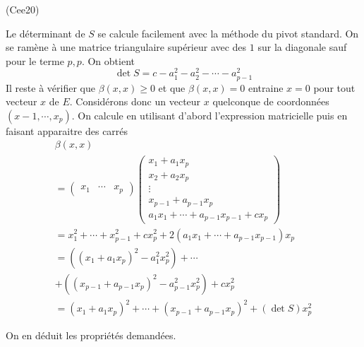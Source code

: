 \begin{tiny}(Cee20)\end{tiny} Le déterminant de $S$ se calcule facilement avec la méthode du pivot standard. On se ramène à une matrice triangulaire supérieur avec des $1$ sur la diagonale sauf pour le terme $p,p$. On obtient
\begin{displaymath}
 \det S = c -a_1^2 - a_2^2 - \cdots - a_{p-1}^2
\end{displaymath}
Il reste à vérifier que $\beta(x,x)\geq 0$ et que $\beta(x,x)=0$ entraine $x=0$ pour tout vecteur $x$ de $E$.\newline
Considérons donc un vecteur $x$ quelconque de coordonnées $(x-1,\cdots,x_p)$. On calcule en utilisant d'abord l'expression matricielle puis en faisant apparaitre des carrés
\begin{multline*}
 \beta(x,x)\\
=
\begin{pmatrix}
 x_1 & \cdots & x_p
\end{pmatrix}
\begin{pmatrix}
 x_1+a_1 x_p \\ x_2+a_2 x_p \\ \vdots \\ x_{p-1}+a_{p-1} x_p \\
a_1x_1+\cdots+a_{p-1}x_{p-1} +cx_p  
\end{pmatrix}
\\
=x_1^2+\cdots + x_{p-1}^2 + cx_p^2 +
2\left( a_1x_1+\cdots+a_{p-1}x_{p-1} \right) x_p\\
=\left((x_1 + a_1x_p)^2-a_1^2x_p^2 \right) + \cdots  \\+ \left((x_{p-1} + a_{p-1}x_p)^2-a_{p-1}^2x_p^2 \right) + cx_p^2\\
= (x_1 + a_1x_p)^2 + \cdots +(x_{p-1} + a_{p-1}x_p)^2+ (\det S )x_p^2
\end{multline*}

On en déduit les propriétés demandées.  
